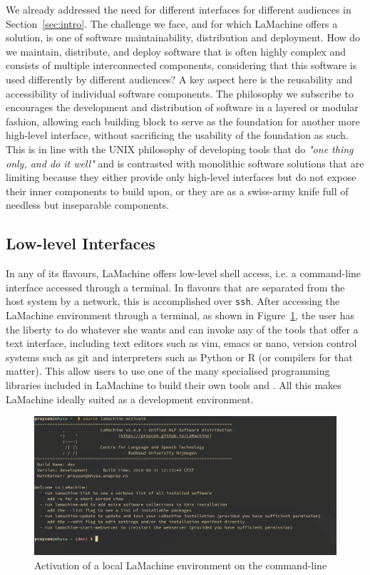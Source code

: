 \documentclass[a4paper,11pt]{article}
\begin{document}
We already addressed the need for different interfaces for different audiences in Section~\ref{sec:intro}. The challenge we
face, and for which LaMachine offers a solution, is one of software maintainability, distribution and deployment. How do
we maintain, distribute, and deploy software that is often highly complex and consists of multiple interconnected components, considering
that this software is used differently by different audiences? A key aspect here is the reusability and accessibility of individual
software components. The philosophy we subscribe to encourages the development and distribution of software in a layered or modular fashion,
allowing each building block to serve as the foundation for another more high-level interface, without sacrificing the usability of the
foundation as such. This is in line with the UNIX philosophy of developing tools that do \emph{"one thing only, and do
it well"} and is contrasted with monolithic software solutions that are limiting because they either provide only high-level interfaces but do not
expose their inner components to build upon, or they are as a swiss-army knife full of needless but inseparable
components.

\subsection{Low-level Interfaces}

In any of its flavours, LaMachine offers low-level shell access, i.e. a command-line interface accessed through a
terminal. In flavours that are separated from the host system by a network, this is accomplished over \texttt{ssh}.
After accessing the LaMachine environment through a terminal, as shown in Figure~\ref{fig:venv}, the user has the liberty to do whatever she wants and can invoke any
of the tools that offer a text interface, including text editors such as vim, emacs or nano, version control systems
such as git and interpreters such as Python or R (or compilers for that matter). This allow users to use
one of the many specialised programming libraries included in LaMachine to build their own tools and . All this makes
LaMachine ideally suited as a development environment.

\begin{figure}[htb] \begin{center}
\includegraphics[width=135.0mm]{screenshot_venv_activate.jpg}
\end{center}
\caption{\footnotesize{Activation of a local LaMachine environment on the command-line}}
\label{fig:venv}
\end{figure}
\end{document}
